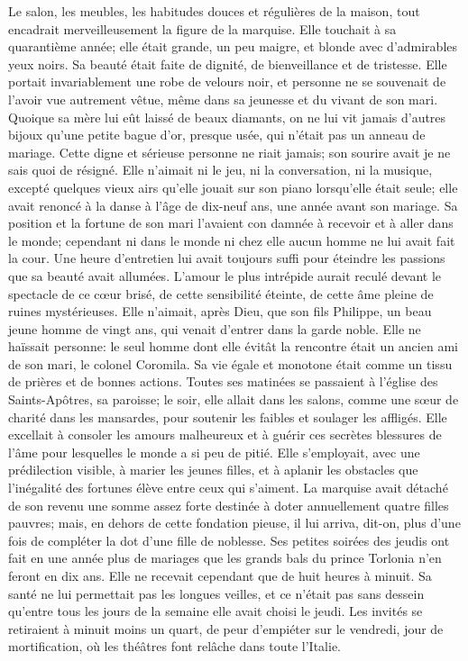 Le salon, les meubles, les habitudes douces et régulières de la maison,
tout encadrait merveilleusement la figure de la marquise. Elle touchait
à sa quarantième année; elle était grande, un peu maigre, et blonde avec
d'admirables yeux noirs. Sa beauté était faite de dignité, de
bienveillance et de tristesse. Elle portait invariablement une robe de
velours noir, et personne ne se souvenait de l'avoir vue autrement
vêtue, même dans sa jeunesse et du vivant de son mari. Quoique sa mère
lui eût laissé de beaux diamants, on ne lui vit jamais d'autres bijoux
qu'une petite bague d'or, presque usée, qui n'était pas un anneau de
mariage. Cette digne et sérieuse personne ne riait jamais; son sourire
avait je ne sais quoi de résigné. Elle n'aimait ni le jeu, ni la
conversation, ni la musique, excepté quelques vieux airs qu'elle jouait
sur son piano lorsqu'elle était seule; elle avait renoncé à la danse à
l'âge de dix-neuf ans, une année avant son mariage. Sa position et la
fortune de son mari l'avaient con damnée à recevoir et à aller dans le
monde; cependant ni dans le monde ni chez elle aucun homme ne lui avait
fait la cour. Une heure d'entretien lui avait toujours suffi pour
éteindre les passions que sa beauté avait allumées. L'amour le plus
intrépide aurait reculé devant le spectacle de ce cœur brisé, de cette
sensibilité éteinte, de cette âme pleine de ruines mystérieuses. Elle
n'aimait, après Dieu, que son fils Philippe, un beau jeune homme de
vingt ans, qui venait d'entrer dans la garde noble. Elle ne haïssait
personne: le seul homme dont elle évitât la rencontre était un ancien
ami de son mari, le colonel Coromila. Sa vie égale et monotone était
comme un tissu de prières et de bonnes actions. Toutes ses matinées se
passaient à l'église des Saints-Apôtres, sa paroisse; le soir, elle
allait dans les salons, comme une sœur de charité dans les mansardes,
pour soutenir les faibles et soulager les affligés. Elle excellait à
consoler les amours malheureux et à guérir ces secrètes blessures de
l'âme pour lesquelles le monde a si peu de pitié. Elle s'employait, avec
une prédilection visible, à marier les jeunes filles, et à aplanir les
obstacles que l'inégalité des fortunes élève entre ceux qui s'aiment. La
marquise avait détaché de son revenu une somme assez forte destinée à
doter annuellement quatre filles pauvres; mais, en dehors de cette
fondation pieuse, il lui arriva, dit-on, plus d'une fois de compléter la
dot d'une fille de noblesse. Ses petites soirées des jeudis ont fait en
une année plus de mariages que les grands bals du prince Torlonia n'en
feront en dix ans. Elle ne recevait cependant que de huit heures à
minuit. Sa santé ne lui permettait pas les longues veilles, et ce
n'était pas sans dessein qu'entre tous les jours de la semaine elle
avait choisi le jeudi. Les invités se retiraient à minuit moins un
quart, de peur d'empiéter sur le vendredi, jour de mortification, où les
théâtres font relâche dans toute l'Italie.


